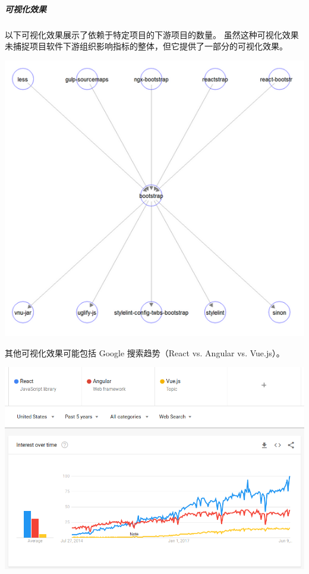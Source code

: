 \hypertarget{ux53efux89c6ux5316ux6548ux679c}{%
\subparagraph{可视化效果}\label{ux53efux89c6ux5316ux6548ux679c}}

以下可视化效果展示了依赖于特定项目的下游项目的数量。
虽然这种可视化效果未捕捉项目软件下游组织影响指标的整体，但它提供了一部分的可视化效果。

\includegraphics{images/organizational-project-skill-demand_paper.png}

其他可视化效果可能包括 Google 搜索趋势（React vs. Angular vs. Vue.js）。

\includegraphics{images/organizational-project-skill-demand_google-trends.png}

